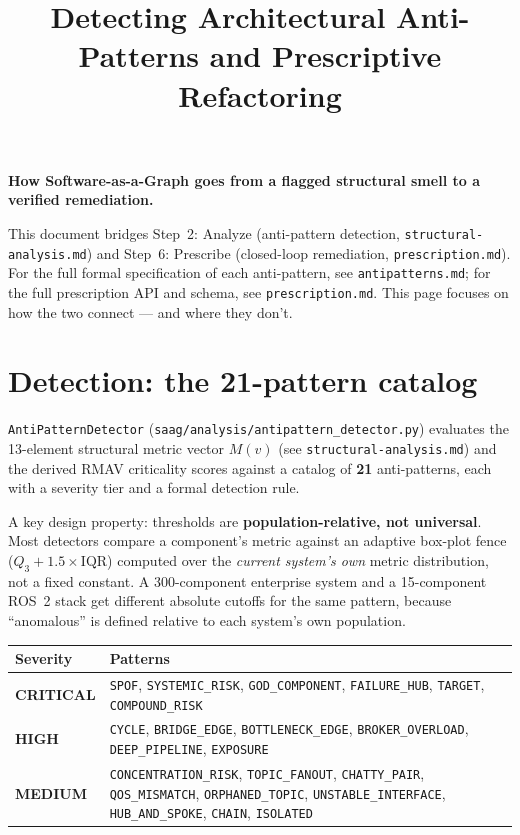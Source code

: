 \documentclass[11pt]{article}
\title{Detecting Architectural Anti-Patterns and Prescriptive Refactoring}
\author{}
\date{}
\begin{document}
\maketitle
\vspace{-2em}

\begin{center}
\textbf{How Software-as-a-Graph goes from a flagged structural smell to a verified remediation.}
\end{center}

\noindent This document bridges Step~2: Analyze (anti-pattern detection, \texttt{structural-analysis.md}) and Step~6: Prescribe (closed-loop remediation, \texttt{prescription.md}). For the full formal specification of each anti-pattern, see \texttt{antipatterns.md}; for the full prescription API and schema, see \texttt{prescription.md}. This page focuses on how the two connect --- and where they don't.

\section{Detection: the 21-pattern catalog}

\texttt{AntiPatternDetector} (\texttt{saag/analysis/antipattern\_detector.py}) evaluates the 13-element structural metric vector $M(v)$ (see \texttt{structural-analysis.md}) and the derived RMAV criticality scores against a catalog of \textbf{21} anti-patterns, each with a severity tier and a formal detection rule.

A key design property: thresholds are \textbf{population-relative, not universal}. Most detectors compare a component's metric against an adaptive box-plot fence ($Q_3 + 1.5 \times \mathrm{IQR}$) computed over the \emph{current system's own} metric distribution, not a fixed constant. A 300-component enterprise system and a 15-component ROS~2 stack get different absolute cutoffs for the same pattern, because ``anomalous'' is defined relative to each system's own population.

\begin{center}
\begin{tabular}{@{}lp{9.5cm}@{}}
\toprule
\textbf{Severity} & \textbf{Patterns} \\
\midrule
\textbf{CRITICAL} & \texttt{SPOF}, \texttt{SYSTEMIC\_RISK}, \texttt{GOD\_COMPONENT}, \texttt{FAILURE\_HUB}, \texttt{TARGET}, \texttt{COMPOUND\_RISK} \\
\textbf{HIGH} & \texttt{CYCLE}, \texttt{BRIDGE\_EDGE}, \texttt{BOTTLENECK\_EDGE}, \texttt{BROKER\_OVERLOAD}, \texttt{DEEP\_PIPELINE}, \texttt{EXPOSURE} \\
\textbf{MEDIUM} & \texttt{CONCENTRATION\_RISK}, \texttt{TOPIC\_FANOUT}, \texttt{CHATTY\_PAIR}, \texttt{QOS\_MISMATCH}, \texttt{ORPHANED\_TOPIC}, \texttt{UNSTABLE\_INTERFACE}, \texttt{HUB\_AND\_SPOKE}, \texttt{CHAIN}, \texttt{ISOLATED} \\
\bottomrule
\end{tabular}
\end{center}
\end{document}

